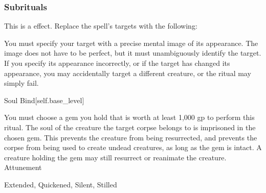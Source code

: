 \subsubsection{Subrituals}
This is a  effect.
Replace the spell's targets with the following:
\begin{spellcontent}
\begin{augmenttargetinginfo}
\spellspecial
You must specify your target with a precise mental image of its appearance.
The image does not have to be perfect, but it must unambiguously identify the target.
If you specify its appearance incorrectly, or if the target has changed its appearance, you may accidentally target a different creature, or the ritual may simply fail.
\end{augmenttargetinginfo}
\end{spellcontent}
\begin{spellsection}{Soul Bind}[self.base_level]
\begin{spellcontent}
\begin{spelltargetinginfo}
\end{spelltargetinginfo}
\begin{spelleffects}
\spellspecial
You must choose a gem you hold that is worth at least 1,000 gp to perform this ritual.
\spelleffect
The soul of the creature the target corpse belongs to is imprisoned in the chosen gem.
This prevents the creature from being resurrected, and prevents the corpse from being used to create undead creatures, as long as the gem is intact.
A creature holding the gem may still resurrect or reanimate the creature.
\spelldur Attunement
\end{spelleffects}
\end{spellcontent}
\begin{spellfooter}
 Extended, Quickened, Silent, Stilled
\end{spellfooter}
\begin{spellsubcontent}
\end{spellsubcontent}
\end{spellsection}
